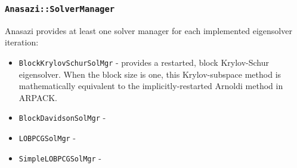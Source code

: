 \documentclass[acmtoms]{acmtrans2m}
\newcommand{\aspace}[1]{\texttt{#1}}
\begin{document}
\subsubsection{\aspace{Anasazi::SolverManager}}

Anasazi provides at least one solver manager for each implemented eigensolver iteration:
\begin{itemize}
  \item \aspace{BlockKrylovSchurSolMgr} - provides a restarted, block Krylov-Schur eigensolver.
  When the block size is one, this Krylov-subspace method is mathematically equivalent to the
  implicitly-restarted Arnoldi method in ARPACK. 
  \item \aspace{BlockDavidsonSolMgr} -
  \item \aspace{LOBPCGSolMgr} -
  \item \aspace{SimpleLOBPCGSolMgr} -
\end{itemize}



\end{document}
